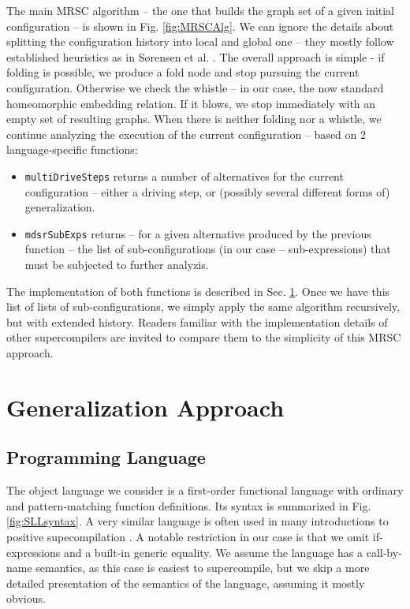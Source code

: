 \documentclass[submission,copyright,creativecommons]{eptcs}
\begin{document}
The main MRSC algorithm -- the one that builds the graph set of a given initial
configuration -- is shown in Fig. \ref{fig:MRSCAlg}.
We can ignore the details about splitting the configuration history into local
and global one -- they mostly follow established heuristics as in S{\o}rensen et al. 
\cite{Sorensen1994TurchinSupercompiler,sorm98b}.
The overall approach is simple - if folding is possible, we produce a fold node 
and stop pursuing the current configuration.
Otherwise we check the whistle -- in our case, the now standard homeomorphic embedding relation.
If it blows, we stop immediately with an empty set of resulting graphs.
When there is neither folding nor a whistle, we continue analyzing the execution of the
current configuration -- based on 2 language-specific functions:
\begin{itemize}
  \item \verb|multiDriveSteps| returns a number of alternatives for the current configuration --
    either a driving step, or (possibly several different forms of) generalization.
  \item \verb|mdsrSubExps| returns -- for a given alternative produced by the previous function --
    the list of sub-configurations (in our case -- sub-expressions) that must be subjected
    to further analyzis.
\end{itemize}
The implementation of both functions is described in Sec. \ref{sec:Generalize}.
Once we have this list of lists of sub-configurations, we simply apply the same
algorithm recursively, but with extended history.
Readers familiar with the implementation details of other supercompilers are
invited to compare them to the simplicity of this MRSC approach.

\section{Generalization Approach}\label{sec:Generalize}

\subsection{Programming Language}

The object language we consider is a first-order functional language with ordinary and 
pattern-matching function definitions.
Its syntax is summarized in Fig. \ref{fig:SLLsyntax}.
A very similar language is often used in many introductions to positive
supecompilation \cite{Sorensen1994TurchinSupercompiler,sorm98b,TMR/SCP2014}.
A notable restriction in our case is that we omit if-expressions and a built-in generic equality.
We assume the language has a call-by-name semantics, as this case is easiest to supercompile,
but we skip a more detailed presentation of the semantics of the language, assuming it mostly obvious.
\end{document}
